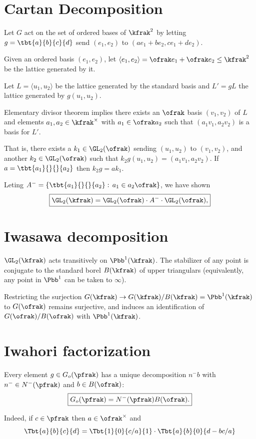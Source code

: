 
\def\Aff{\rm Aff}
\section{Cartan Decomposition}
Let $G$ act on the set of ordered bases of $\kfrak^2$ by letting $g=\tbt{a}{b}{c}{d}$ send $(e_1,e_2)$ to $(ae_1 +b e_2 , ce_1 +de_2).$ 

Given an ordered basis $(e_1,e_2)$, let $\langle e_1,e_2\rangle = \ofrak e_1 + \ofrak e_2  \leq \kfrak^2$ be the lattice generated by it. 

Let $L=\langle u_1,u_2 \rangle $ be the lattice generated by the standard basis and $L'= gL$ the lattice generated by $g(u_1,u_2).$

Elementary divisor theorem implies there exists an $\ofrak$ basis $(v_1,v_2)$ of $L$ and elements $a_1,a_2 \in \kfrak^\times $ with $a_1 \in \ofrak a_2$ such that $(a_1v_1,a_2v_2)$ is a basis for $L'$. 

That is, there exists a $k_1 \in \GL_2(\ofrak)$ sending $(u_1,u_2)$ to $(v_1,v_2)$, and another $k_2 \in \GL_2(\ofrak)$ such that $k_2 g(u_1,u_2) = (a_1 v_1, a_2 v_2).$ If $a = \tbt{a_1}{}{}{a_2}$ then $k_2 g = a k_1$.  

Leting $A^{-}  = \{\tbt{a_1}{}{}{a_2}: \, a_1 \in a_2 \ofrak \}$, we have shown
\[ \boxed{
\GL_2(\kfrak) = \GL_2(\ofrak) \cdot A^{-} \cdot \GL_2(\ofrak), 
}\]

\section{Iwasawa decomposition} 
$\GL_2(\kfrak)$ acts transitively on $\Pbb^1(\kfrak)$. The stabilizer of any point is conjugate to the standard borel $B(\kfrak)$ of upper triangulars (equivalently, any point in $\Pbb^1$ can be taken to $\infty$).

Restricting the surjection $G(\kfrak) \to G(\kfrak) / B(\kfrak) = \Pbb^1(\kfrak)$ to $G(\ofrak)$ remains surjective, and induces an identification of $G(\ofrak) / B(\ofrak)$ with $\Pbb^1(\kfrak)$. 

\section{Iwahori factorization}
Every element $g \in G_o(\pfrak)$ has a unique decomposition $n^{-} b$ with $n^{-} \in N^{-}(\pfrak)$ and $b\in B(\ofrak)$:
\[ 
	\boxed{
		G_o(\pfrak) = N^{-} (\pfrak) B(\ofrak). 
	}
\]

Indeed, if $c\in \pfrak$ then $a \in \ofrak^\times$  and 
\[ \Tbt{a}{b}{c}{d} = \Tbt{1}{0}{c/a}{1} \cdot   \Tbt{a}{b}{0}{d-bc/a} \]